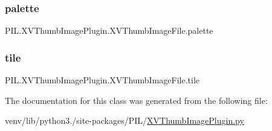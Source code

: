\subsubsection{\texorpdfstring{palette}{palette}}
{\footnotesize\ttfamily P\+I\+L.\+X\+V\+Thumb\+Image\+Plugin.\+X\+V\+Thumb\+Image\+File.\+palette}

\mbox{\label{classPIL_1_1XVThumbImagePlugin_1_1XVThumbImageFile_a6e3166a446830681001d92527d8d2ef7}} 
\subsubsection{\texorpdfstring{tile}{tile}}
{\footnotesize\ttfamily P\+I\+L.\+X\+V\+Thumb\+Image\+Plugin.\+X\+V\+Thumb\+Image\+File.\+tile}



The documentation for this class was generated from the following file\+:\begin{DoxyCompactItemize}
\item 
venv/lib/python3./site-\/packages/\+P\+I\+L/\hyperlink{XVThumbImagePlugin_8py}{X\+V\+Thumb\+Image\+Plugin.\+py}\end{DoxyCompactItemize}
